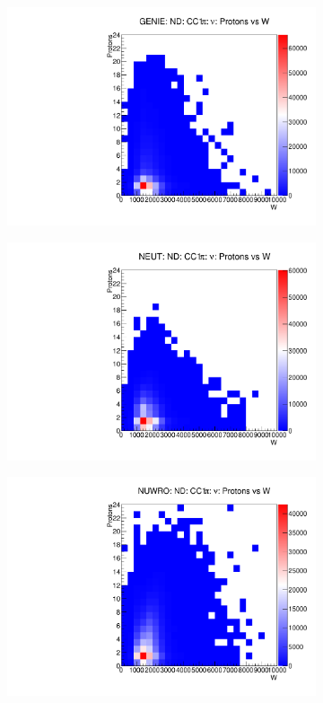\documentclass[12pt]{article}
\begin{document}
\begin{figure}
\centering
\begin{subfigure}[b]{0.32\textwidth}
  \includegraphics[width=\textwidth]{nprotons_w/Nprotons_W_nuc_rest_res_GENIE_ND_numu.pdf}
\end{subfigure}
\begin{subfigure}[b]{0.32\textwidth}
  \includegraphics[width=\textwidth]{nprotons_w/Nprotons_W_nuc_rest_res_NEUT_ND_numu.pdf}
\end{subfigure}
\begin{subfigure}[b]{0.32\textwidth}
  \includegraphics[width=\textwidth]{nprotons_w/Nprotons_W_nuc_rest_res_NUWRO_ND_numu.pdf}

\end{subfigure}
\end{figure}
\end{document}
